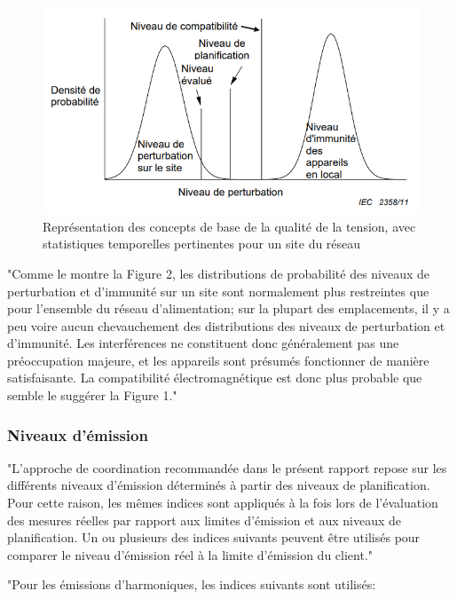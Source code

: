 \begin{figure}[H]
    \begin{center}
        \includegraphics[width=\textwidth]{assets/figures/IECTR61000_tab3.png}
    \end{center}
    \caption{Représentation des concepts de base de la qualité de la tension, avec statistiques temporelles pertinentes pour un site du réseau}
    \label{IECTR61000_tab3}
\end{figure}

"Comme le montre la Figure 2, les distributions de probabilité des niveaux de perturbation et d'immunité sur un site sont normalement plus restreintes que pour l'ensemble du réseau d'alimentation; sur la plupart des emplacements, il y a peu voire aucun chevauchement des distributions des niveaux de perturbation et d'immunité. Les interférences ne constituent donc généralement pas une préoccupation majeure, et les appareils sont présumés fonctionner de manière satisfaisante. La compatibilité électromagnétique est donc plus probable que semble le suggérer la Figure 1."


\subsubsection{Niveaux d'émission}

"L'approche de coordination recommandée dans le présent rapport repose sur les différents niveaux d'émission déterminés à partir des niveaux de planification. Pour cette raison, les mêmes indices sont appliqués à la fois lors de l'évaluation des mesures réelles par rapport aux limites d'émission et aux niveaux de planification.
Un ou plusieurs des indices suivants peuvent être utilisés pour comparer le niveau d'émission réel à la limite d'émission du client."

"Pour les émissions d'harmoniques, les indices suivants sont utilisés:

